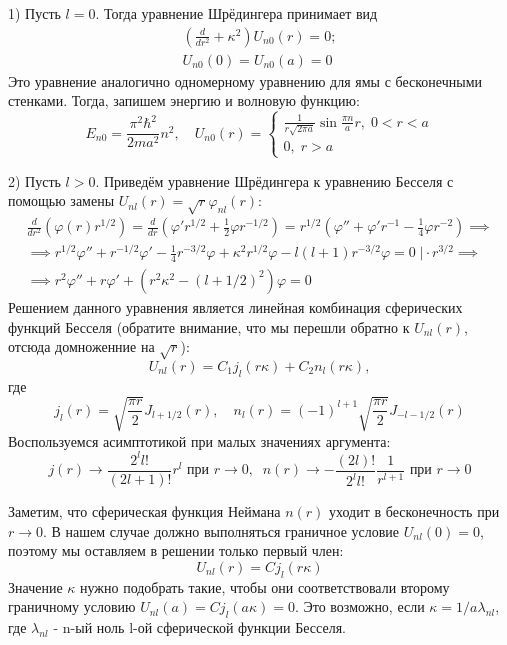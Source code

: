 1) Пусть $l = 0$. Тогда уравнение Шрёдингера принимает вид 
\begin{gather*}
\left(\frac{d}{dr^2} + \kappa^2\right)U_{n0}(r) = 0;\\
U_{n0}(0) = U_{n0}(a) = 0
\end{gather*}
Это уравнение аналогично одномерному уравнению для ямы с бесконечными стенками. Тогда, запишем энергию и волновую функцию:
\[
E_{n0} = \frac{\pi^2\hbar^2}{2ma^2}n^2, \quad U_{n0}(r) =
\begin{cases}
    \frac{1}{r\sqrt{2\pi a}}\sin\frac{\pi n}{a}r, \; 0 < r < a\\
    0, \; r > a
\end{cases}
\]

2) Пусть $l > 0$. Приведём уравнение Шрёдингера к уравнению Бесселя с помощью замены $U_{nl}(r) = \sqrt{r}\varphi_{nl}(r)$:
\begin{gather*}
\frac{d}{dr^2}\left(\varphi(r)r^{1/2}\right) = \frac{d}{dr}\left( \varphi'r^{1/2} + \frac{1}{2}\varphi r^{-1/2} \right) = r^{1/2}\left(\varphi'' + \varphi'r^{-1} - \frac{1}{4}\varphi r^{-2}\right) \implies \\
\implies r^{1/2}\varphi'' + r^{-1/2}\varphi' - \frac{1}{4}r^{-3/2}\varphi + \kappa^2r^{1/2}\varphi - l(l+1)r^{-3/2}\varphi = 0 \; \Bigg| \cdot r^{3/2} \implies \\
\implies r^2\varphi''+ r\varphi' + (r^2\kappa^2 - (l+1/2)^2)\varphi = 0
\end{gather*}
Решением данного уравнения является линейная комбинация сферических функций Бесселя (обратите внимание, что мы перешли обратно к $U_{nl}(r)$, отсюда домноженние на $\sqrt{r}$):
\[
U_{nl}(r) = C_1j_l(r\kappa) + C_2n_l(r\kappa),
\]
где
\[
j_l(r) = \sqrt{\frac{\pi r}{2}}J_{l+1/2}(r), \quad n_l(r) = (-1)^{l+1}\sqrt{\frac{\pi r}{2}}J_{-l-1/2}(r)
\]
Воспользуемся асимптотикой при малых значениях аргумента:
\[
j(r)\rightarrow\frac{2^l l!}{(2l+1)!}r^l \text{ при } r\rightarrow0, \;\; n(r)\rightarrow -\frac{(2l)!}{2^l l!}\frac{1}{r^{l+1}} \text{ при } r\rightarrow 0 
\]

Заметим, что сферическая функция Неймана $n(r)$ уходит в бесконечность при $r \rightarrow 0$. В нашем случае должно выполняться граничное условие $U_{nl}(0) = 0$, поэтому мы оставляем в решении только первый член:
\[
U_{nl}(r) = Cj_l(r\kappa)
\]
Значение $\kappa$ нужно подобрать такие, чтобы они соответствовали второму граничному условию $U_{nl}(a) = Cj_l(a\kappa) = 0$. Это возможно, если $\kappa = 1/a \lambda_{nl}$, где $\lambda_{nl}$ - n-ый ноль l-ой сферической функции Бесселя. 

